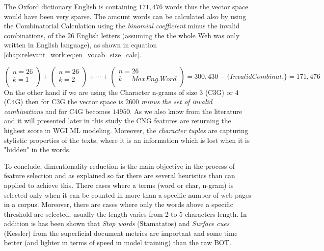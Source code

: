 The Oxford dictionary English is containing $171,476$ words thus the vector space would have been very sparse. The amount words can be calculated also by using the Combinatorial Calculation using the \textit{binomial coefficient} minus the invalid combinations, of the $26$ English letters (assuming the the whole Web was only written in English language), as shown in equation \ref{chap:relevant_work:eq:en_vocab_size_calc}.

\begin{equation}\label{chap:relevant_work:eq:en_vocab_size_calc}
	 \left(
    	\begin{array}{c}
        	n = 26\\
            k = 1\\
         \end{array}
	\right)
    +
    \left(
    	\begin{array}{c}
        	n = 26\\
            k = 2\\
         \end{array}
	\right) 
    +
     \cdots 
    +
   \left(
    	\begin{array}{c}
        	n = 26\\
            k = Max Eng. Word\\
         \end{array}
	\right) 
    = 300,430 - \{Invalid Combinat.\} =  171,476
\end{equation}
On the other hand if we are using the Character n-grams of size $3$ (C3G) or $4$ (C4G) then for C3G the vector space is $2600$ \textit{minus the set of invalid combinations} and for C4G becomes $14950$. As we also know from the literature and it will presented later in this study the CNG features are returning the highest score in WGI ML modeling. Moreover, the \textit{character tuples} are capturing stylistic properties of the texts, where it is an information which is lost when it is "hidden" in the words.

To conclude, dimentionality reduction is the main objective in the process of feature selection and as explained so far there are several heuristics than can applied to achieve this. There cases where a terms (word or char, n-gram) is selected only when it can be counted in more than a specific number of web-pages in a corpus. Moreover, there are cases where only the words above a specific threshold are selected, usually the length varies from 2 to 5 characters length. In addition is has been shown that \textit{Stop words} (Stamatatos) and 
\textit{Surface cues} (Kessler) from the superficial document metrics are important and some time better (and lighter in terms of speed in model training) than the raw BOT. 

